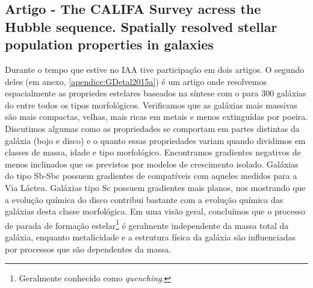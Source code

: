 
\subsection{Artigo - The CALIFA Survey acress the Hubble sequence. Spatially resolved stellar
population properties in galaxies}

Durante o tempo que estive no IAA tive participação em dois artigos. O segundo deles \citep[][GD15
daqui em diante]{GonzalezDelgado.etal.2015a} (em anexo, \ref{apendice:GDetal2015a}) é um artigo onde
resolvemos espacialmente as propriedes estelares baseados na síntese com o \starlight para 300
galáxias do \CAL entre todos os tipos morfológicos. Verificamos que as galáxias mais massivas são
mais compactas, velhas, mais ricas em metais e menos extinguídas por poeira. Discutimos algumas como
as propriedades se comportam em partes distintas da galáxia (bojo e disco) e o quanto essas
propriedades variam quando dividimos em classes de massa, idade e tipo morfológico. Encontramos
gradientes negativos de  menos inclinados que os previstos por modelos de
crescimento isolado. Galáxias do tipo Sb-Sbc possuem gradientes de  compatíveis
com aqueles medidos para a Via Láctea. Galáxias tipo Sc possuem gradientes mais planos, nos
mostrando que a evolução química do disco contribui bastante com a evolução química das galáxias
desta classe morfológica. Em uma visão geral, concluímos que o processo de parada de formação
estelar\footnote{Geralmente conhecido como {\em quenching}.} é geralmente independente da massa
total da galáxia, enquanto metalicidade e a estrutura física da galáxia são influenciadas por
processos que são dependentes da massa.




